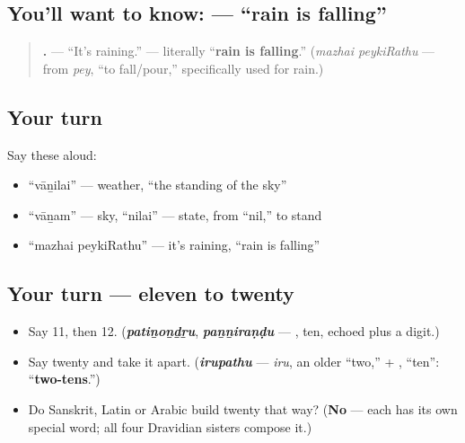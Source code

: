 \subsection*{You'll want to know:   — \textquotedblleft{}rain is falling\textquotedblright{}}
\begin{quote}
\textbf{ .} — \textquotedblleft{}It's raining.\textquotedblright{} — literally \textquotedblleft{}\textbf{rain is falling}.\textquotedblright{} (\emph{mazhai peykiRathu} — from \textbf{} \emph{pey}, \textquotedblleft{}to fall/pour,\textquotedblright{} specifically used for rain.)
\end{quote}

\subsection*{Your turn}
Say these aloud:

\begin{itemize}
\raggedright
  \item \textquotedblleft{}vāṉilai\textquotedblright{} — weather, \textquotedblleft{}the standing of the sky\textquotedblright{}
  \item \textquotedblleft{}vāṉam\textquotedblright{} — sky, \textquotedblleft{}nilai\textquotedblright{} — state, from \textquotedblleft{}nil,\textquotedblright{} to stand
  \item \textquotedblleft{}mazhai peykiRathu\textquotedblright{} — it's raining, \textquotedblleft{}rain is falling\textquotedblright{}
\end{itemize}

\subsection*{Your turn — eleven to twenty}
\begin{itemize}
\raggedright
  \item Say 11, then 12. (\emph{\textbf{patiṉoṉḏṟu}}, \emph{\textbf{paṉṉiraṇḍu}} — \textbf{}, ten, echoed plus a digit.)
  \item Say twenty and take it apart. (\emph{\textbf{irupathu}} — \emph{iru}, an older \textquotedblleft{}two,\textquotedblright{} + \textbf{}, \textquotedblleft{}ten\textquotedblright{}: \textquotedblleft{}\textbf{two-tens}.\textquotedblright{})
  \item Do Sanskrit, Latin or Arabic build twenty that way? (\textbf{No} — each has its own special word; all four Dravidian sisters compose it.)
\end{itemize}

